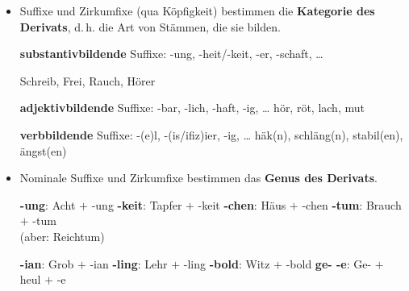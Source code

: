 \begin{frame}

\begin{itemize}
\item Suffixe und Zirkumfixe (qua Köpfigkeit) bestimmen die \textbf{Kategorie des Derivats}, d.\,h. die Art von Stämmen, die sie bilden.

\ea 
\ea \textbf{substantivbildende} Suffixe: -ung, -heit/-keit, -er, -schaft, \dots

\ex Schreib, Frei, Rauch, Hörer
\z 
\z

\ea 
\ea \textbf{adjektivbildende} Suffixe: -bar, -lich, -haft, -ig, \dots 
\ex hör, röt, lach, mut
\z 
\z

\ea 
\ea \textbf{verbbildende} Suffixe: -(e)l, -(is/ifiz)ier, -ig, \dots
\ex häk(n), schläng(n), stabil(en), ängst(en)
\z 
\z

\pause 

\item Nominale Suffixe und Zirkumfixe bestimmen das \textbf{Genus des Derivats}.

\begin{multicols}{2}

\begin{exe}
\ex \textbf{-ung}:  Acht $+$ -ung
\ex \textbf{-keit}: Tapfer $+$ -keit
\ex \textbf{-chen}: Häus $+$ -chen
\ex \textbf{-tum}: Brauch $+$ -tum\\
(aber: Reichtum)
\end{exe}

\columnbreak

\begin{exe}	
\ex \textbf{-ian}: Grob $+$ -ian
\ex \textbf{-ling}: Lehr $+$ -ling
\ex \textbf{-bold}: Witz $+$ -bold
\ex \textbf{ge- -e}: Ge- $+$ heul $+$ -e

~ %
\end{exe}

\end{multicols}

\end{itemize}

\end{frame}



